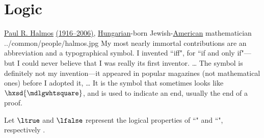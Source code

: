 \section{Logic}
\qboxnpq
  {
    \href{http://en.wikipedia.org/wiki/Paul_halmos}{Paul R. Halmos}
    \href{http://www-history.mcs.st-andrews.ac.uk/Timelines/TimelineG.html}{(1916--2006)},
    \href{http://www-history.mcs.st-andrews.ac.uk/BirthplaceMapsOld/Places/Germany.html}{Hungarian}-born
    Jewish-\href{http://www-history.mcs.st-andrews.ac.uk/BirthplaceMapsOld/Places/USA.html}{American} mathematician
    \footnotemark
  }
  {../common/people/halmos.jpg}
  {My most nearly immortal contributions are an abbreviation and a typographical symbol.
      I invented ``iff", for ``if and only if"---but I could never believe that I was really
      its first inventor.%
      \ldots
      The symbol is definitely not my invention---it appeared in popular magazines
      (not mathematical ones) before I adopted it,%
      \ldots
      It is the symbol that sometimes looks like $\hxsd{\mdlgwhtsquare}$, %
      and is used to indicate an end, usually the end of a proof.}



\begin{definition}
\label{def:==>}
\label{def:implies}
\label{def:onlyif}
Let $\ltrue$ and $\lfalse$ represent the logical properties of ``" and
``", respectively .
\end{definition}

